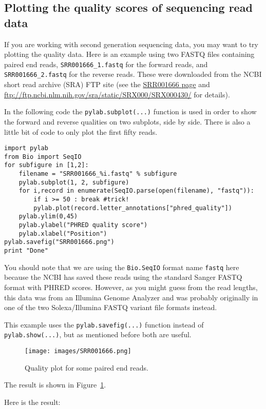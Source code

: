 \documentclass{report}
\begin{document}
\subsection{Plotting the quality scores of sequencing read data}

If you are working with second generation sequencing data, you may want to try plotting
the quality data. Here is an example using two FASTQ files containing paired end reads,
\texttt{SRR001666\_1.fastq} for the forward reads, and  \texttt{SRR001666\_2.fastq} for
the reverse reads. These were downloaded from the NCBI short read archive (SRA) FTP site
(see the \href{http://www.ncbi.nlm.nih.gov/Traces/sra/sra.cgi?cmd=viewer&m=data&s=viewer&run=SRR001666}
{SRR001666 page} and \url{ftp://ftp.ncbi.nlm.nih.gov/sra/static/SRX000/SRX000430/}
for details).

In the following code the \verb|pylab.subplot(...)| function is used in order to show
the forward and reverse qualities on two subplots, side by side. There is also a little
bit of code to only plot the first fifty reads.

\begin{verbatim}
import pylab
from Bio import SeqIO
for subfigure in [1,2]:
    filename = "SRR001666_%i.fastq" % subfigure
    pylab.subplot(1, 2, subfigure)
    for i,record in enumerate(SeqIO.parse(open(filename), "fastq")):
        if i >= 50 : break #trick!
        pylab.plot(record.letter_annotations["phred_quality"])
    pylab.ylim(0,45)
    pylab.ylabel("PHRED quality score")
    pylab.xlabel("Position")
pylab.savefig("SRR001666.png")
print "Done"
\end{verbatim}

You should note that we are using the \verb|Bio.SeqIO| format name \texttt{fastq}
here because the NCBI has saved these reads using the standard Sanger FASTQ format
with PHRED scores. However, as you might guess from the read lengths, this data was
from an Illumina Genome Analyzer and was probably originally in one of the two
Solexa/Illumina FASTQ variant file formats instead.

This example uses the \verb|pylab.savefig(...)| function instead of
\verb|pylab.show(...)|, but as mentioned before both are useful.
\begin{latexonly}
\begin{figure}[htbp]
\centering
\texttt{[image: images/SRR001666.png]}
\caption{Quality plot for some paired end reads.}
\label{fig:paired-end-qual-plot}
\end{figure}
The result is shown in Figure~\ref{fig:paired-end-qual-plot}.
\end{latexonly}
\begin{htmlonly}
Here is the result:


\end{htmlonly}
\end{document}
